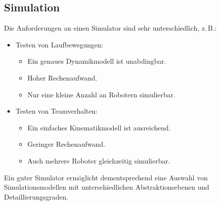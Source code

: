 \documentclass[a4paper, 11pt, accentcolor = tud3b]{tudreport}
\begin{document}
			\subsection{Simulation}
				Die Anforderungen an einen Simulator sind sehr unterschiedlich, z.\,B.:
				\begin{itemize}
					\item Testen von Laufbewegungen:
						\begin{itemize}
							\item Ein genaues Dynamikmodell ist unabdingbar.
							\item Hoher Rechenaufwand.
							\item Nur eine kleine Anzahl an Robotern simulierbar.
						\end{itemize}
					\item Testen von Teamverhalten:
						\begin{itemize}
							\item Ein einfaches Kinematikmodell ist ausreichend.
							\item Geringer Rechenaufwand.
							\item Auch mehrere Roboter gleichzeitig simulierbar.
						\end{itemize}
				\end{itemize}
				Ein guter Simulator ermöglicht dementsprechend eine Auswahl von Simulationsmodellen mit unterschiedlichen Abstraktionsebenen und Detaillierungsgraden.
\end{document}
